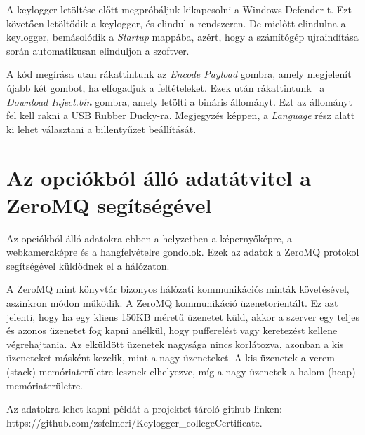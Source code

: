 \documentclass[12pt,a4paper,oneside]{report}
\begin{document}
A keylogger letöltése előtt megpróbáljuk kikapcsolni a Windows Defender-t. Ezt követően letöltődik a keylogger, és elindul a rendszeren. De mielőtt elindulna a keylogger, bemásolódik a \textit{Startup} mappába, azért, hogy a számítógép ujraindítása során automatikusan elinduljon a szoftver.

A kód megírása utan rákattintunk az \textit{Encode Payload} gombra, amely megjelenít újabb két gombot, ha elfogadjuk a feltételeket. Ezek után rákattintunk \ a \textit{Download Inject.bin} gombra, amely letölti a bináris állományt. Ezt az állományt fel kell rakni a USB Rubber Ducky-ra. Megjegyzés képpen, a \textit{Language} rész alatt ki lehet választani a billentyűzet beállítását.

\section{Az opciókból álló adatátvitel a ZeroMQ segítségével}
Az opciókból álló adatokra ebben a helyzetben a képernyőképre, a webkameraképre és a hangfelvételre gondolok. Ezek az adatok a ZeroMQ protokol segítségével küldődnek el a hálózaton.

A ZeroMQ mint könyvtár bizonyos hálózati kommunikációs minták követésével, aszinkron módon működik. A ZeroMQ kommunikáció üzenetorientált. Ez azt jelenti, hogy ha egy kliens 150KB méretű üzenetet küld, akkor a szerver egy teljes és azonos üzenetet fog kapni anélkül, hogy pufferelést vagy keretezést kellene végrehajtania. Az elküldött üzenetek nagysága nincs korlátozva, azonban a kis üzeneteket másként kezelik, mint a nagy üzeneteket. A kis üzenetek a verem (stack) memóriaterületre lesznek elhelyezve, míg a nagy üzenetek a halom (heap) memóriaterületre.

Az adatokra lehet kapni példát a projektet tároló github linken: https://github.com/zsfelmeri/Keylogger\_collegeCertificate.
\end{document}
